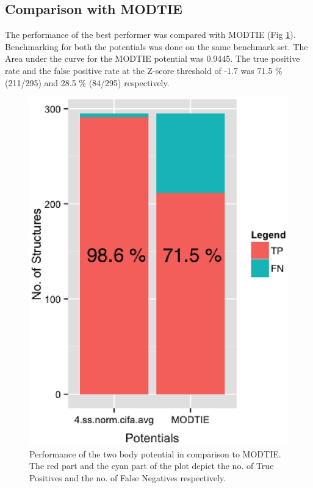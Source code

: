 \subsection{Comparison with MODTIE}
The performance of the best performer was compared with MODTIE \citep{Davis2006} (Fig \ref{compare_modtie}). Benchmarking for both the potentials was done on the same benchmark set. The Area under the curve for the MODTIE potential was 0.9445. The true positive rate and the false positive rate at the Z-score threshold of -1.7 was 71.5 \% (211/295) and 28.5 \% (84/295) respectively.
\begin{figure}[H]
	\centering
	\includegraphics[scale = 0.3]{./results/modtie_TP.eps}
	\caption[Comparison between MODTIE and our potentials]{Performance of the two body potential in comparison to MODTIE. The red part  and the cyan part of the plot depict the no. of True Positives and the no. of False Negatives respectively.}
	\label{compare_modtie}
\end{figure}

